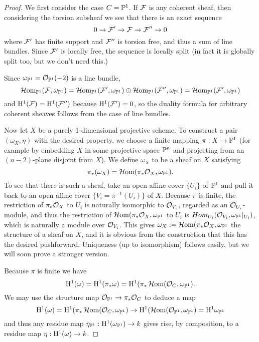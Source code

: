 \begin{proof}
 
We first consider the case $C={\mathbb P}^{1}$. If ${\mathcal F}$ is any coherent sheaf, then considering the torsion subsheaf we see that there is an exact sequence
$$
0\to {\mathcal F}' \to {\mathcal F} \to {\mathcal F}''\to 0
$$ 
where ${\mathcal F}'$ has finite support and ${\mathcal F}''$ is torsion free, and thus a sum of line bundles. Since
${\mathcal F}'$ is locally free, the sequence is locally split (in fact it is globally split too, but we don't need this.)

Since $\omega_{{\mathbb P}^{1}} = {\mathcal O}_{{\mathbb P}^{1}}(-2)$ is a line bundle, 
$$
\operatorname{{\mathcal H} om}_{{\mathbb P}^1}({\mathcal F}, \omega_{{\mathbb P}^{1}}) = 
\operatorname{{\mathcal H} om}_{{\mathbb P}^1}({\mathcal F}', \omega_{{\mathbb P}^{1}}) \oplus \operatorname{{\mathcal H} om}_{{\mathbb P}^1}({\mathcal F}'', \omega_{{\mathbb P}^{1}})  = 
\operatorname{{\mathcal H} om}_{{\mathbb P}^1}({\mathcal F}', \omega_{{\mathbb P}^{1}}) 
$$
and 
${\rm{H}}^{1}({\mathcal F}) = {\rm{H}}^{1}({\mathcal F}'')
$
because ${\rm{H}}^{1}({\mathcal F}') = 0$, so the duality formula for arbitrary coherent sheaves follows from the case of line bundles.

Now let $X$ be a purely 1-dimensional projective scheme. To construct a pair
$(\omega_{X}, \eta)$ with the desired property, we choose a finite mapping 
$\pi: X\to {\mathbb P}^{1}$ (for example by embedding $X$ in some projective space ${\mathbb P}^{n}$ and
projecting from an $(n-2)$-plane disjoint from $X$). We define $\omega_{X}$ to be a sheaf
on $X$ satisfying
$$
\pi_{*}(\omega_{X}) = \operatorname{{\mathcal H} om}(\pi_{*}{\mathcal O}_{X}, \omega_{{\mathbb P}^{1}}).
$$
To see that there is such a sheaf, take an open affine cover $\{U_{i}\}$ of ${\mathbb P}^{1}$ and pull it back to an open affine cover $\{V_{i} = \pi^{-1}(U_{i})\}$ of $X$. Because $\pi$ is finite, the restriction of 
$\pi_{*} {\mathcal O}_{X}$ to $U_{i}$ is naturally isomorphic to ${\mathcal O}_{V_{i}}$, regarded as an ${\mathcal O}_{U_{i}}$-module, and thus the restriction of
$\operatorname{{\mathcal H} om}(\pi_{*}{\mathcal O}_{X}, \omega_{{\mathbb P}^{1}}$ to $U_{i}$ is 
$Hom_{U_{i}}({\mathcal O}_{V_{i}}, \omega_{{\mathbb P}^{1}}|_{U_{i}})$,
which is naturally a module over ${\mathcal O}_{V_{i}}$. This gives $\omega_{X}:= \operatorname{{\mathcal H} om}(\pi_{*}{\mathcal O}_{X}, \omega_{{\mathbb P}^{1}}$
the structure of a sheaf on $X$, and it is obvious from the construction that this has the desired pushforward. Uniqueness (up to isomorphism) follows easily, but we will soon prove a stronger version.

Because $\pi$ is finite we have
$$
{\rm{H}}^{1}(\omega) = {\rm{H}}^{1}(\pi_{*}\omega) 
= {\rm{H}}^{1}(\pi_{*}\operatorname{{\mathcal H} om}({\mathcal O}_{C}, \omega_{{\mathbb P}^{1}}).
$$
We may use the structure map ${\mathcal O}_{{\mathbb P}^{1}} \to \pi_{*}{\mathcal O}_{C}$ to deduce
a map  
$$
{\rm{H}}^{1}(\omega) = 
{\rm{H}}^{1}(\pi_{*}\operatorname{{\mathcal H} om}({\mathcal O}_{C}, \omega_{{\mathbb P}^{1}})
\to
{\rm{H}}^{1}(\operatorname{{\mathcal H} om}({\mathcal O}_{{\mathbb P}^{1}}, \omega_{{\mathbb P}^{1}})
= {\rm{H}}^{1}\omega_{{\mathbb P}^{1}}
$$
and thus any residue map $\eta_{{\mathbb P}^{1}}: {\rm{H}}^{1}(\omega_{{\mathbb P}^{1}}) \to k$
gives rise, by composition, to a residue map 
$\eta: {\rm{H}}^{1}(\omega)\to k$.


\end{proof}
